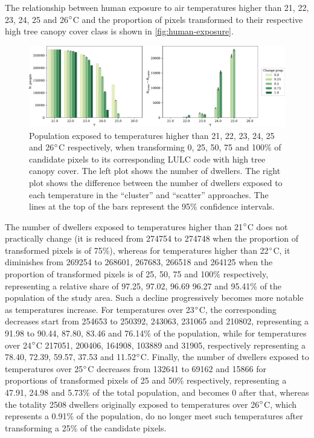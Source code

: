\documentclass[10pt,letterpaper]{article}
\begin{document}
The relationship between human exposure to air temperatures higher than 21, 22, 23, 24, 25 and 26$\degree$C and the proportion of pixels transformed to their respective high tree canopy cover class is shown in \autoref{fig:human-exposure}.
\begin{figure}[ht]
  \centering
  \includegraphics[width=.98\textwidth]{figures/human-exposure}
  \caption{\label{fig:human-exposure} Population exposed to temperatures higher than 21, 22, 23, 24, 25 and 26$\degree$C respectively, when transforming 0, 25, 50, 75 and 100\% of candidate pixels to its corresponding LULC code with high tree canopy cover. The left plot shows the number of dwellers. The right plot shows the difference between the number of dwellers exposed to each temperature in the ``cluster'' and ``scatter'' approaches. The lines at the top of the bars represent the 95\% confidence intervals.}
\end{figure}
The number of dwellers exposed to temperatures higher than 21$\degree$C does not practically change (it is reduced from 274754 to 274748 when the proportion of transformed pixels is of 75\%), whereas for temperatures higher than 22$\degree$C, it diminishes from 269254 to 268601, 267683, 266518 and 264125 when the proportion of transformed pixels is of 25, 50, 75 and 100\% respectively, representing a relative share of 97.25, 97.02, 96.69 96.27 and 95.41\% of the population of the study area.
Such a decline progressively becomes more notable as temperatures increase.
For temperatures over 23$\degree$C, the corresponding decreases start from 254653 to 250392, 243063, 231065 and 210802, representing a 91.98 to 90.44, 87.80, 83.46 and 76.14\% of the population, while for temperatures over 24$\degree$C 217051, 200406, 164908, 103889 and 31905, respectively representing a 78.40, 72.39, 59.57, 37.53 and 11.52$\degree$C.
Finally, the number of dwellers exposed to temperatures over 25$\degree$C decreases from 132641 to 69162 and 15866 for proportions of transformed pixels of 25 and 50\% respectively, representing a 47.91, 24.98 and 5.73\% of the total population, and becomes 0 after that, whereas the totality 2508 dwellers originally exposed to temperatures over 26$\degree$C, which represents a 0.91\% of the population, do no longer meet such temperatures after transforming a 25\% of the candidate pixels.
\end{document}
